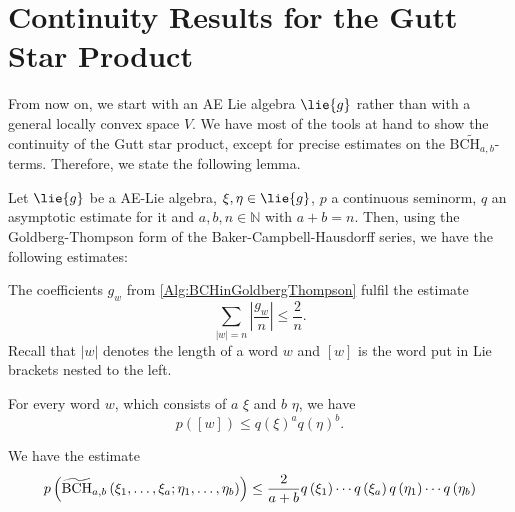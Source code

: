 \section{Continuity Results for the Gutt Star Product}
\label{sec:chap5_TopologyStar}

From now on, we start with an AE Lie algebra $\lie{g}$ rather than with a 
general locally convex space $V$. We have most of the tools at hand to show the 
continuity of the Gutt star product, except for precise estimates on the 
$\widetilde{\mathrm{BCH}_{a, b}}$-terms. Therefore, we state the following lemma.
\begin{lemma}
	\label{LCAna:Lemma:BCHTermsEstiamte}
	Let $\lie{g}$ be a AE-Lie algebra, $\xi, \eta \in \lie{g}$, $p$ a 
	continuous seminorm, $q$ an	asymptotic estimate for it and $a, b, n \in 
	\mathbb{N}$ with $a + b = n$. Then, using the Goldberg-Thompson form of 
	the Baker-Campbell-Hausdorff series, we have the following estimates:
	\begin{lemmalist}
	  \item \label{Item:ThompsonEstimate}
		The coefficients $g_w$ from \eqref{Alg:BCHinGoldbergThompson} 
		fulfil the estimate
		\begin{equation}
			\label{LCAna:ThompsonEstimate}
			\sum\limits_{|w| = n}
			\left| \frac{g_w}{n} \right|
			\leq
			\frac{2}{n}.
		\end{equation}
		Recall that $|w|$ denotes the length of a word $w$ and $[w]$ is the
		word put in Lie brackets nested to  the left.
	\item \label{Item:AEonWords}
		For every word $w$, which consists of $a$ $\xi$ and $b$ $\eta$,
		we have
		\begin{equation}
		\label{LCAna:AEonWords}
			p([w])
			\leq
			q(\xi)^a q(\eta)^b.
		\end{equation}
	\item \label{Item:BCHEstimate}
		We have the estimate
		\begin{equation}
		\label{LCAna:BCHEstimate}
			p \left(
				\widetilde{\mathrm{BCH}}_{a, b}\left(\xi_1, \ldots, \xi_a; \eta_1, \ldots, \eta_b\right)
			\right)
			\leq
			\frac{2}{a + b}
			q\left( \xi_1 \right) \cdots q\left( \xi_a \right)
			q\left( \eta_1 \right) \cdots q\left( \eta_b \right)
		\end{equation}
	\end{lemmalist}
\end{lemma}
